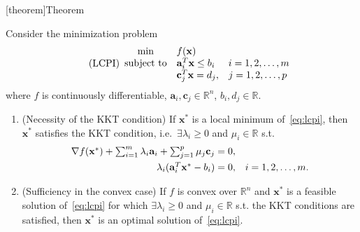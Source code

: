 \documentclass[12pt]{report}
\theoremstyle{definition}
\begin{document}
[theorem]{Theorem}
\begin{KKT for LCP}
    Consider the minimization problem
    \begin{equation}\label{eq:lcpi}
        \tag{LCPI}
        \begin{array}{c @{\quad} l @{\quad} l}
            \min & f(\mathbf{x}) & \\
            \text{subject to} & \mathbf{a}_i^T\mathbf{x}\le b_i & i=1,2,\ldots,m \\
                              & \mathbf{c}_j^T\mathbf{x}=d_j, & j=1,2,\ldots,p
        \end{array} 
    \end{equation} 
    where $f$ is continuously differentiable,
    $\mathbf{a}_i,\mathbf{c}_j\in\mathbb{R}^{n}$, $b_i,d_j\in\mathbb{R}$.
    \begin{enumerate}[label = (\roman*)]
        \item (Necessity of the KKT condition)
            If $\mathbf{x}^*$ is a local minimum of~\eqref{eq:lcpi}, then
            $\mathbf{x}^*$ satisfies the KKT condition, i.e.\
            $\exists\lambda_i\ge 0$ and $\mu_i\in\mathbb{R}$ s.t.
            \begin{equation*}
                \begin{array}{r @{\quad} l}
                    \nabla f(\mathbf{x}^*)+\sum_{i=1}^{m}
                    \lambda_i\mathbf{a}_i+\sum_{j=1}^{p} \mu_j\mathbf{c}_j=0, &
                    \\[1ex]
                    \lambda_i(\mathbf{a}_i^T\mathbf{x}^*-b_i)=0, &
                    i=1,2,\ldots,m.
                \end{array} 
            \end{equation*}
        \item (Sufficiency in the convex case) If $f$ is convex over
            $\mathbb{R}^{n}$ and $\mathbf{x}^*$ is a feasible solution
            of~\eqref{eq:lcpi} for which $\exists\lambda_i\ge 0$ and
            $\mu_i\in\mathbb{R}$ s.t. the KKT conditions are satisfied, then
            $\mathbf{x}^*$ is an optimal solution of~\eqref{eq:lcpi}.
    \end{enumerate}
\end{KKT for LCP}
\end{document}
